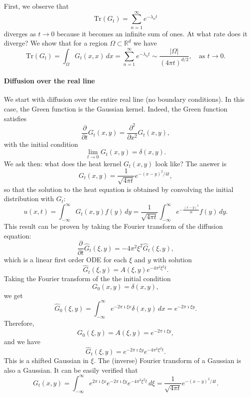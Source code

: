 First, we observe that $$\text{Tr}(G_t) = \sum_{n=1}^\infty e^{-\lambda_n t}$$ diverges as $t\to 0$ because it becomes an infinite sum of ones. At what rate does it diverge?
We show that for a region $\Omega \subset \mathbb{R}^d$ we have
\begin{equation*}
\text{Tr}(G_t)=\int_\Omega G_t(x,x)\, dx = \sum_{n=1}^\infty e^{-\lambda_n t} \sim \frac{|\Omega|}{(4\pi t)^{d/2}},\quad \text{as } t\to 0.
\end{equation*}

\paragraph{Diffusion over the real line}
We start with diffusion over the entire real line (no boundary conditions). In this case, the Green function is the Gaussian kernel. Indeed,
the Green function satisfies $$\frac{\partial}{\partial t}G_t(x,y)=\frac{\partial^2}{\partial x^2}G_t(x,y),$$ with the initial condition $$\lim_{t\to 0}G_t(x,y)=\delta(x,y).$$  We ask then: what does the heat kernel $G_t(x,y)$ look like? The answer is $$G_t(x,y) = \frac{1}{\sqrt{4\pi t}} e^{-(x-y)^2/{4t}},$$
so that the solution to the heat equation is obtained by convolving the initial distribution with $G_t$:
\begin{equation*}
u(x,t)=\int_{-\infty}^\infty G_t(x,y)f(y)\,dy = \frac{1}{\sqrt{4\pi t}}\int_{-\infty}^\infty e^{-\frac{(x-y)^2}{4t}}f(y)\,dy.
\end{equation*}
This result can be proven by taking the Fourier transform of the diffusion equation:
\begin{equation*}
\frac{\partial}{\partial t}\hat{G}_t(\xi,y)= -4\pi^2\xi^2\hat{G}_t(\xi,y),
\end{equation*}
which is a linear first order ODE for each $\xi$ and $y$ with solution
\begin{equation*}
\hat{G}_t(\xi, y) = A(\xi,y) e^{-4\pi^2 \xi^2 t}.
\end{equation*}
Taking the Fourier transform of the the initial condition
\begin{equation*}
G_0(x,y) = \delta(x,y),
\end{equation*}
we get
\begin{equation*}
\hat{G}_0(\xi,y) = \int_{-\infty}^\infty e^{-2\pi \imath \xi x} \delta(x,y)\,dx = e^{-2\pi \imath \xi y}.
\end{equation*}
Therefore,
\begin{equation*}
\hat{G}_0(\xi,y) = A(\xi,y) = e^{-2\pi \imath \xi y},
\end{equation*}
and we have
\begin{equation*}
\hat{G}_t(\xi, y) = e^{-2\pi \imath \xi y} e^{-4\pi^2 \xi^2 t}.
\end{equation*}
This is a shifted Gaussian in $\xi$. The (inverse) Fourier transform of a Gaussian is also a Gaussian. It can be easily verified that 
\begin{equation*}
G_t(x,y) = \int_{-\infty}^\infty e^{2\pi \imath \xi x}e^{-2\pi \imath \xi y} e^{-4\pi^2 \xi^2 t}\,d\xi = \frac{1}{\sqrt{4\pi t}} e^{-(x-y)^2/{4t}}.
\end{equation*}

